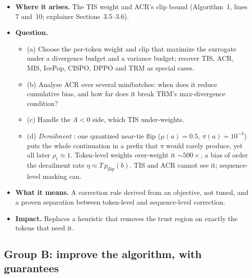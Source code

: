 \documentclass[11pt]{article}
\begin{document}
\begin{itemize}
\item \textbf{Where it arises.} The TIS weight and ACR's clip bound (Algorithm~1, lines 7 and~10; explainer Sections~3.5--3.6).
\item \textbf{Question.}
  \begin{itemize}
  \item (a) Choose the per-token weight and clip that maximize the surrogate under a divergence budget and a variance budget; recover TIS, ACR, MIS, IcePop, CISPO, DPPO \citep{qi2026dppo} and TRM \citep{li2025trm} as special cases.
  \item (b) Analyse ACR over several minibatches: when does it reduce cumulative bias, and how far does it break TRM's max-divergence condition?
  \item (c) Handle the $A<0$ side, which TIS under-weights.
  \item (d) \emph{Derailment} \tagderived: one quantized near-tie flip ($\mu(a)=0.5$, $\pi(a)=10^{-3}$) puts the whole continuation in a prefix that $\pi$ would rarely produce, yet all later $\rho_t\approx1$. Token-level weights over-weight it ${\sim}500\times$, a bias of order the derailment rate $\eta\approx T\,p_{\mathrm{flip}}(b)$. TIS and ACR cannot see it; sequence-level masking can.
  \end{itemize}
\item \textbf{What it means.} A correction rule derived from an objective, not tuned, and a proven separation between token-level and sequence-level correction.
\item \textbf{Impact.} Replaces a heuristic that removes the trust region on exactly the tokens that need it.
\end{itemize}

\subsection{Group B: improve the algorithm, with guarantees}
\end{document}
